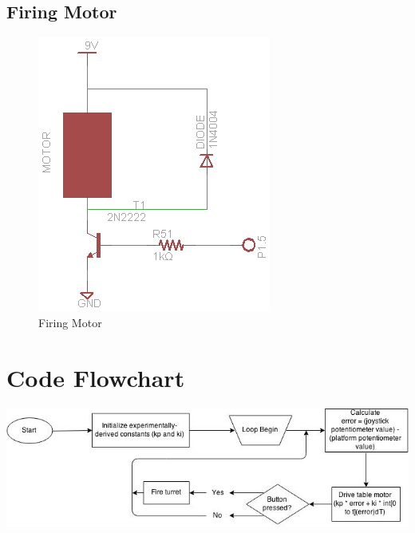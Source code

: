 \documentclass[a4paper, 11pt]{article}
\begin{document}
	\subsection{Firing Motor}
	\begin{figure}[!ht]
		\centering
		\includegraphics{firing-motor}
		\caption{Firing Motor}
	\end{figure}
\newpage
\section{Code Flowchart}
\bigskip
\begin{center}
	\includegraphics[width=7in]{group-turret-flowchart}
\end{center}
\end{document}
